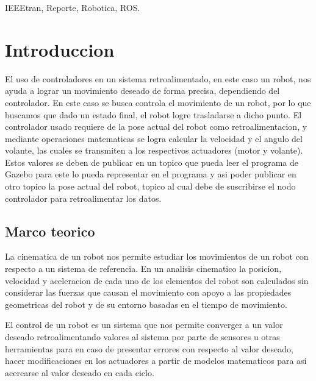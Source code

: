 \documentclass[journal]{IEEEtran}
\begin{document}
\begin{IEEEkeywords}
IEEEtran, Reporte, Robotica, ROS.
\end{IEEEkeywords}







\IEEEpeerreviewmaketitle



\section{Introduccion}
El uso de controladores en un sistema retroalimentado, en este caso un robot, nos ayuda a lograr un movimiento deseado de forma precisa, dependiendo del controlador. En este caso se busca controla el movimiento de un robot, por lo que buscamos que dado un estado final, el robot logre trasladarse a dicho punto. El controlador usado requiere de la pose actual del robot como retroalimentacion, y mediante operaciones matematicas se logra calcular la velocidad y el angulo del volante, las cuales se transmiten a los respectivos actuadores (motor y volante). Estos valores se deben de publicar en un topico que pueda leer el programa de Gazebo para este lo pueda representar en el programa y asi poder publicar en otro topico la pose actual del robot, topico al cual debe de suscribirse el nodo controlador para retroalimentar los datos. 
\subsection{Marco teorico}
La cinematica de un robot nos permite estudiar los movimientos de un robot con respecto a un sistema de referencia. En un analisis cinematico la posicion, velocidad y aceleracion de cada uno de los elementos del robot son calculados sin considerar las fuerzas que causan el movimiento con apoyo a las propiedades geometricas del robot y de su entorno basadas en el tiempo de movimiento. 

El control de un robot es un sistema que nos permite converger a un valor deseado retroalimentando valores al sistema por parte de sensores u otras herramientas para en caso de presentar errores con respecto al valor deseado, hacer modificaciones en los actuadores a partir de modelos matematicos para así acercarse al valor deseado en cada ciclo. 
\end{document}
